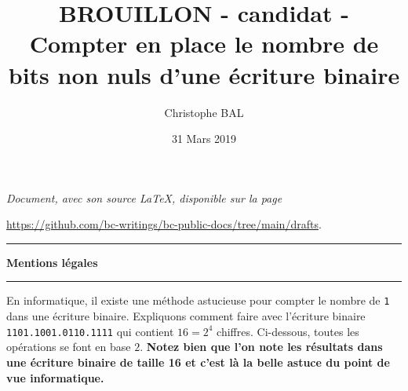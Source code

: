 \documentclass[12pt]{amsart}
\begin{document}
\title{BROUILLON - candidat - Compter en place le nombre de bits non nuls d'une écriture binaire}
\author{Christophe BAL}
\date{31 Mars 2019}

\maketitle

\begin{center}
	\itshape
	Document, avec son source \LaTeX, disponible sur la page

	\url{https://github.com/bc-writings/bc-public-docs/tree/main/drafts}.
\end{center}


\bigskip


\begin{center}
	\hrule\vspace{.3em}
	{
		\fontsize{1.35em}{1em}\selectfont
		\textbf{Mentions \og légales \fg}
	}

	\vspace{0.45em}
	\doclicenseThis
	\hrule
\end{center}


\bigskip


En informatique, il existe une méthode astucieuse pour compter le nombre de \verb+1+ dans une écriture binaire.
Expliquons comment faire avec l'écriture binaire \verb+1101.1001.0110.1111+ qui contient $16 = 2^4$ chiffres. Ci-dessous, toutes les opérations se font en base $2$.
\textbf{Notez bien que l'on note les résultats dans une écriture binaire  de taille 16 et c'est là la belle astuce du point de vue informatique.}
\end{document}
